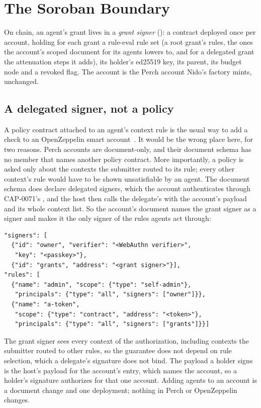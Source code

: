 \section{The Soroban Boundary}\label{sec:soroban}

On chain, an agent's grant lives in a \emph{grant signer}
(): a contract deployed once per account, holding
for each grant a rule-eval rule set (a root grant's rules, the ones the
account's scoped document for its agents lowers to, and for a delegated
grant the attenuation steps it adds), its holder's ed25519 key, its parent,
its budget node and a revoked flag. The account is the Perch account Nido's
factory mints, unchanged.

\subsection{A delegated signer, not a policy}

A policy contract attached to an agent's context rule is the usual way to add a
check to an OpenZeppelin smart account~\cite{ozStellarAccounts}. It would be
the wrong place here, for two reasons. Perch accounts are document-only, and
their document schema has no member that names another policy contract. More
importantly, a policy is asked only about the contexts the submitter routed to
its rule; every other context's rule would have to be shown unsatisfiable by an
agent. The document schema does declare delegated signers, which the account
authenticates through CAP-0071's , and the host
then calls the delegate's  with the account's payload
and its whole context list. So the account's document
names the grant signer as a signer and makes it the only signer of the rules
agents act through:
\begin{lstlisting}[basicstyle=\ttfamily\scriptsize]
"signers": [
  {"id": "owner", "verifier": "<WebAuthn verifier>",
   "key": "<passkey>"},
  {"id": "grants", "address": "<grant signer>"}],
"rules": [
  {"name": "admin", "scope": {"type": "self-admin"},
   "principals": {"type": "all", "signers": ["owner"]}},
  {"name": "a-token",
   "scope": {"type": "contract", "address": "<token>"},
   "principals": {"type": "all", "signers": ["grants"]}}]
\end{lstlisting}
The grant signer sees every context of the authorization, including contexts
the submitter routed to other rules, so the guarantee does not depend on rule
selection, which a delegate's signature does not bind. The payload a holder
signs is the host's payload for the account's entry, which names the account,
so a holder's signature authorizes for that one account. Adding agents to an
account is a document change and one deployment; nothing in Perch or
OpenZeppelin changes.

